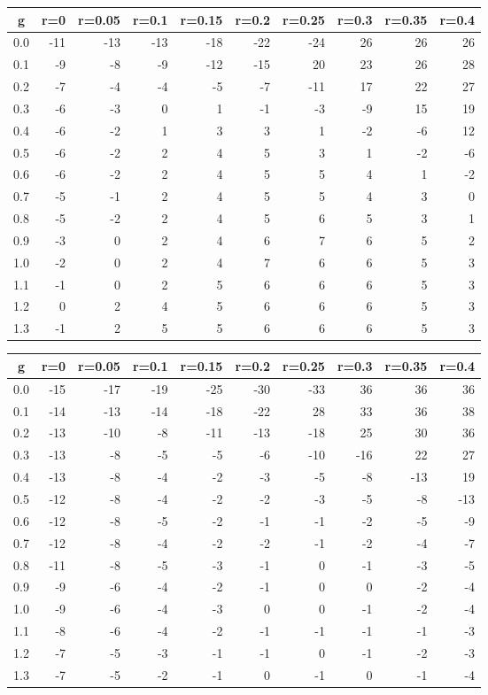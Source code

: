 %
\begin{table}[!tbp]
 \begin{center}
 \begin{tabular}{rrrrrrrrrr}\hline\hline
\multicolumn{1}{c}{g}&\multicolumn{1}{c}{r=0}&\multicolumn{1}{c}{r=0.05}&\multicolumn{1}{c}{r=0.1}&\multicolumn{1}{c}{r=0.15}&\multicolumn{1}{c}{r=0.2}&\multicolumn{1}{c}{r=0.25}&\multicolumn{1}{c}{r=0.3}&\multicolumn{1}{c}{r=0.35}&\multicolumn{1}{c}{r=0.4}\tabularnewline
\hline
0.0&-11&-13&-13&-18&-22&-24&26&26&26\tabularnewline
0.1& -9& -8& -9&-12&-15& 20&23&26&28\tabularnewline
0.2& -7& -4& -4& -5& -7&-11&17&22&27\tabularnewline
0.3& -6& -3&  0&  1& -1& -3&-9&15&19\tabularnewline
0.4& -6& -2&  1&  3&  3&  1&-2&-6&12\tabularnewline
0.5& -6& -2&  2&  4&  5&  3& 1&-2&-6\tabularnewline
0.6& -6& -2&  2&  4&  5&  5& 4& 1&-2\tabularnewline
0.7& -5& -1&  2&  4&  5&  5& 4& 3& 0\tabularnewline
0.8& -5& -2&  2&  4&  5&  6& 5& 3& 1\tabularnewline
0.9& -3&  0&  2&  4&  6&  7& 6& 5& 2\tabularnewline
1.0& -2&  0&  2&  4&  7&  6& 6& 5& 3\tabularnewline
1.1& -1&  0&  2&  5&  6&  6& 6& 5& 3\tabularnewline
1.2&  0&  2&  4&  5&  6&  6& 6& 5& 3\tabularnewline
1.3& -1&  2&  5&  5&  6&  6& 6& 5& 3\tabularnewline
\hline
\end{tabular}

\end{center}

\end{table}

%
\begin{table}[!tbp]
 \begin{center}
 \begin{tabular}{rrrrrrrrrr}\hline\hline
\multicolumn{1}{c}{g}&\multicolumn{1}{c}{r=0}&\multicolumn{1}{c}{r=0.05}&\multicolumn{1}{c}{r=0.1}&\multicolumn{1}{c}{r=0.15}&\multicolumn{1}{c}{r=0.2}&\multicolumn{1}{c}{r=0.25}&\multicolumn{1}{c}{r=0.3}&\multicolumn{1}{c}{r=0.35}&\multicolumn{1}{c}{r=0.4}\tabularnewline
\hline
0.0&-15&-17&-19&-25&-30&-33& 36& 36& 36\tabularnewline
0.1&-14&-13&-14&-18&-22& 28& 33& 36& 38\tabularnewline
0.2&-13&-10& -8&-11&-13&-18& 25& 30& 36\tabularnewline
0.3&-13& -8& -5& -5& -6&-10&-16& 22& 27\tabularnewline
0.4&-13& -8& -4& -2& -3& -5& -8&-13& 19\tabularnewline
0.5&-12& -8& -4& -2& -2& -3& -5& -8&-13\tabularnewline
0.6&-12& -8& -5& -2& -1& -1& -2& -5& -9\tabularnewline
0.7&-12& -8& -4& -2& -2& -1& -2& -4& -7\tabularnewline
0.8&-11& -8& -5& -3& -1&  0& -1& -3& -5\tabularnewline
0.9& -9& -6& -4& -2& -1&  0&  0& -2& -4\tabularnewline
1.0& -9& -6& -4& -3&  0&  0& -1& -2& -4\tabularnewline
1.1& -8& -6& -4& -2& -1& -1& -1& -1& -3\tabularnewline
1.2& -7& -5& -3& -1& -1&  0& -1& -2& -3\tabularnewline
1.3& -7& -5& -2& -1&  0& -1&  0& -1& -4\tabularnewline
\hline
\end{tabular}

\end{center}

\end{table}

